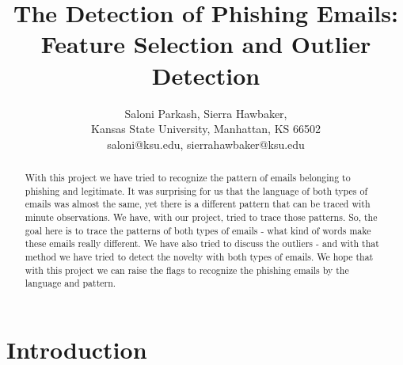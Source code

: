 \documentclass[article,pdftex,10pt,a4paper,twocolumn]{article}
\begin{document}
\title{The Detection of Phishing Emails: Feature Selection and Outlier Detection}

\author{Saloni Parkash, Sierra Hawbaker, \\ \small Kansas State University, Manhattan, KS 66502 \\ \small saloni@ksu.edu, sierrahawbaker@ksu.edu}


\maketitle

\begin{abstract}
With this project we have tried to recognize the pattern of emails belonging to phishing and legitimate. It was surprising for us that the language of both types of emails was almost the same, yet there is a different pattern that can be traced with minute observations.  We have, with our project, tried to trace those patterns. So, the goal here is to trace the patterns of both types of emails - what kind of words make these emails really different. We have also tried to discuss the outliers - and with that  method we have tried to detect the novelty with both types of emails. We hope that with this project we can raise the flags to recognize  the phishing emails by the language and pattern.
\end{abstract}


\section{Introduction}
\label{introduction}



\end{document}
